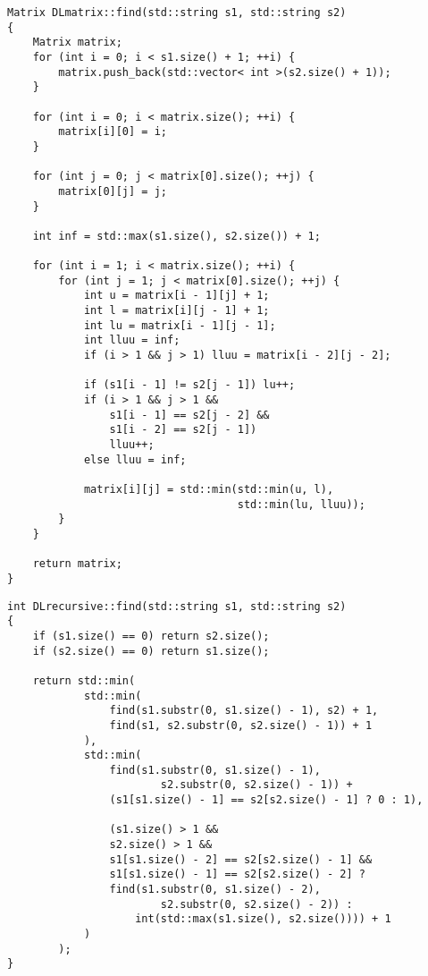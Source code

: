 \begin{lstlisting}[caption=Расстояние Дамерау-Левенштейна матричный метод]
Matrix DLmatrix::find(std::string s1, std::string s2)
{
    Matrix matrix;
    for (int i = 0; i < s1.size() + 1; ++i) {
        matrix.push_back(std::vector< int >(s2.size() + 1));
    }

    for (int i = 0; i < matrix.size(); ++i) {
        matrix[i][0] = i;
    }

    for (int j = 0; j < matrix[0].size(); ++j) {
        matrix[0][j] = j;
    }

    int inf = std::max(s1.size(), s2.size()) + 1;

    for (int i = 1; i < matrix.size(); ++i) {
        for (int j = 1; j < matrix[0].size(); ++j) {
            int u = matrix[i - 1][j] + 1;
            int l = matrix[i][j - 1] + 1;
            int lu = matrix[i - 1][j - 1];
            int lluu = inf;
            if (i > 1 && j > 1) lluu = matrix[i - 2][j - 2];

            if (s1[i - 1] != s2[j - 1]) lu++;
            if (i > 1 && j > 1 &&
                s1[i - 1] == s2[j - 2] &&
                s1[i - 2] == s2[j - 1])
                lluu++;
            else lluu = inf;

            matrix[i][j] = std::min(std::min(u, l),
                                    std::min(lu, lluu));
        }
    }

    return matrix;
}
\end{lstlisting}

\begin{lstlisting}[caption=Расстояние Дамерау-Левенштейна рекурсивный метод]
int DLrecursive::find(std::string s1, std::string s2)
{
    if (s1.size() == 0) return s2.size();
    if (s2.size() == 0) return s1.size();

    return std::min(
            std::min(
                find(s1.substr(0, s1.size() - 1), s2) + 1,
                find(s1, s2.substr(0, s2.size() - 1)) + 1
            ),
            std::min(
                find(s1.substr(0, s1.size() - 1),
                        s2.substr(0, s2.size() - 1)) +
                (s1[s1.size() - 1] == s2[s2.size() - 1] ? 0 : 1),

                (s1.size() > 1 &&
                s2.size() > 1 &&
                s1[s1.size() - 2] == s2[s2.size() - 1] &&
                s1[s1.size() - 1] == s2[s2.size() - 2] ?
                find(s1.substr(0, s1.size() - 2),
                        s2.substr(0, s2.size() - 2)) :
                    int(std::max(s1.size(), s2.size()))) + 1
            )
        );
}

\end{lstlisting}

